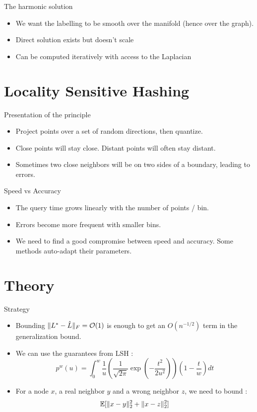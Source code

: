 \documentclass[11pt)]{beamer}
\begin{document}
\begin{frame}{The harmonic solution}
\begin{itemize}
 \item We want the labelling to be smooth over the manifold (hence over the graph).
 \item Direct solution exists but doesn't scale
 \item Can be computed iteratively with access to the Laplacian
\end{itemize}
\end{frame}
\section{Locality Sensitive Hashing}
\begin{frame}{Presentation of the principle}
\begin{itemize}
 \item Project points over a set of random directions, then quantize.
 \item Close points will stay close. Distant points will often stay distant.
 \item Sometimes two close neighbors will be on two sides of a boundary, leading to errors.
\end{itemize}
\end{frame}

\begin{frame}{Speed vs Accuracy}
\begin{itemize}
 \item The query time grows linearly with the number of points / bin.
 \item Errors become more frequent with smaller bins. 
 \item We need to find a good compromise between speed and accuracy. Some methods auto-adapt their parameters.
\end{itemize}
\end{frame}

\section{Theory}
\begin{frame}{Strategy}
\begin{itemize}
 \item Bounding $\Arrowvert L^*-\hat{L}\Arrowvert_F=\mathcal{O}(1)$ is enough to get an $O(n^{-1/2})$ term in the generalization bound.
 \item We can use the guarantees from LSH :
 $$p^w(u) = \int_0^w \frac{1}{u}\left( \frac{1}{\sqrt{2\pi}}\exp(-\frac{t^2}{2u^2})\right)\left(1-\frac{t}{w}\right)dt$$
 \item For a node $x$, a real neighbor $y$ and a wrong neighbor $z$, we need to bound : 
 $$\mathbb{E}[\Arrowvert x-y\Arrowvert_2^2 + \Arrowvert x-z\Arrowvert_2^2]$$
\end{itemize}

\end{frame}
\end{document}

